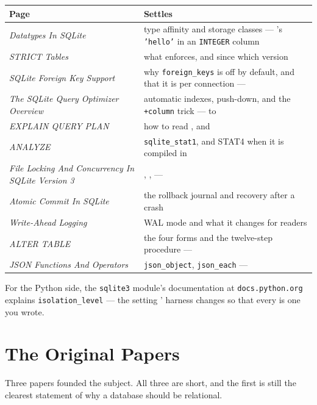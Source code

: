 \medskip
\begin{longtable}{@{}L{6.0cm}L{8.0cm}@{}}
\toprule
{}
\textbf{Page} & \textbf{Settles} \\
\midrule
\endhead
\emph{Datatypes In SQLite} & type affinity and storage classes ---
  's \texttt{'hello'} in an \texttt{INTEGER} column \\
\emph{STRICT Tables} & what  enforces, and since which version \\
\emph{SQLite Foreign Key Support} & why \texttt{foreign\_keys} is off by
  default, and that it is per connection ---  \\
\emph{The SQLite Query Optimizer Overview} & automatic indexes, push-down,
  and the \texttt{+column} trick ---  to  \\
\emph{EXPLAIN QUERY PLAN} & how to read ,  and
   \\
\emph{ANALYZE} & \texttt{sqlite\_stat1}, and STAT4 when it is compiled in \\
\emph{File Locking And Concurrency In SQLite Version 3} & ,
  ,  ---  \\
\emph{Atomic Commit In SQLite} & the rollback journal and recovery after a
  crash \\
\emph{Write-Ahead Logging} & WAL mode and what it changes for readers \\
\emph{ALTER TABLE} & the four forms and the twelve-step procedure ---
   \\
\emph{JSON Functions And Operators} & \texttt{json\_object},
  \texttt{json\_each} ---  \\
\bottomrule
\end{longtable}

\medskip
For the Python side, the \texttt{sqlite3} module's documentation at
\texttt{docs.python.org} explains \texttt{isolation\_level} --- the setting
' harness changes so that every  is one you
wrote.

\section{The Original Papers}

Three papers founded the subject. All three are short, and the first is still
the clearest statement of why a database should be relational.

